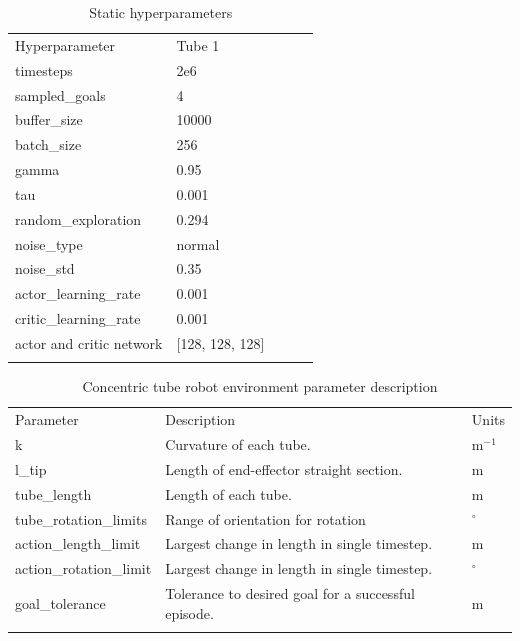 \begin{table}
\caption{Static hyperparameters}
\label{tab:1} 
\begin{tabular}{lllll}
\hline\noalign{\smallskip}
Hyperparameter  & Tube 1 \\
\noalign{\smallskip}\hline\noalign{\smallskip}
timesteps & 2e6 \\
sampled\_goals & 4 \\
buffer\_size & 10000 \\
batch\_size & 256 \\
gamma & 0.95 \\
tau & 0.001 \\
random\_exploration & 0.294 \\
noise\_type & normal \\
noise\_std & 0.35 \\
actor\_learning\_rate & 0.001 \\
critic\_learning\_rate & 0.001 \\
actor and critic network & [128, 128, 128] \\

\noalign{\smallskip}\hline
\end{tabular}
\end{table}

\begin{table}
\caption{Concentric tube robot environment parameter description}
\label{tab:2}       %
\begin{tabular}{lll}
\hline\noalign{\smallskip}
Parameter & Description & Units\\
\noalign{\smallskip}\hline\noalign{\smallskip}
k & Curvature of each tube. & m$^{-1}$ \\
l\_tip & Length of end-effector straight section. & m \\
tube\_length & Length of each tube. & m\\
tube\_rotation\_limits & Range of orientation for rotation & $^\circ$ \\
action\_length\_limit & Largest change in length in single timestep. & m \\
action\_rotation\_limit & Largest change in length in single timestep. & $^\circ$ \\
goal\_tolerance & Tolerance to desired goal for a successful episode. & m \\

\noalign{\smallskip}\hline
\end{tabular}
\end{table}

